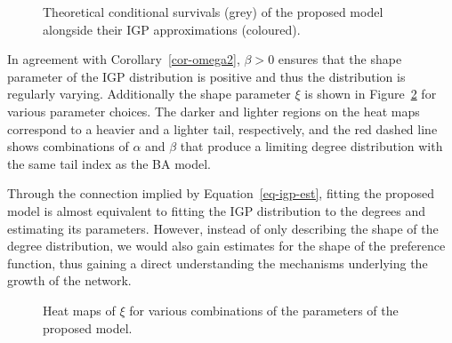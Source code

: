 \documentclass[
  sn-basic,
]{sn-jnl}
\theoremstyle{plain}
\theoremstyle{plain}
\theoremstyle{remark}
\begin{document}
\begin{figure}


\caption{\label{fig-approx_surv}Theoretical conditional survivals (grey)
of the proposed model alongside their IGP approximations (coloured).}

\end{figure}%

In agreement with Corollary~\ref{cor-omega2}, \(\beta>0\) ensures that
the shape parameter of the IGP distribution is positive and thus the
distribution is regularly varying. Additionally the shape parameter
\(\xi\) is shown in Figure~\ref{fig-polyheat} for various parameter
choices. The darker and lighter regions on the heat maps correspond to a
heavier and a lighter tail, respectively, and the red dashed line shows
combinations of \(\alpha\) and \(\beta\) that produce a limiting degree
distribution with the same tail index as the BA model.

Through the connection implied by Equation~\ref{eq-igp-est}, fitting the
proposed model is almost equivalent to fitting the IGP distribution to
the degrees and estimating its parameters. However, instead of only
describing the shape of the degree distribution, we would also gain
estimates for the shape of the preference function, thus gaining a
direct understanding the mechanisms underlying the growth of the
network.

\begin{figure}


\caption{\label{fig-polyheat}Heat maps of \(\xi\) for various
combinations of the parameters of the proposed model.}

\end{figure}%
\end{document}
